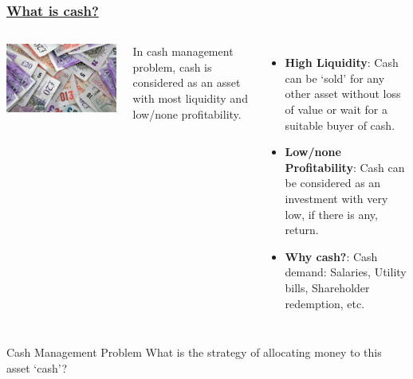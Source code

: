 \documentclass{beamer}
\begin{document}
\begin{frame}
\frametitle{\hyperlink{intro}{What is cash?}}
\begin{columns}
\begin{sideways}
\centering
\includegraphics[scale = 0.25]{cash}
\end{sideways}
In cash management problem, cash is considered as an asset with most liquidity and low/none profitability.

\begin{itemize}
\item<2-> \textbf{High Liquidity}: Cash can be `sold' for any other asset without loss of value or wait for a suitable buyer of cash.
\item<3-> \textbf{Low/none Profitability}: Cash can be considered as an investment with very low, if there is any, return.
\item<4>\textbf{Why cash?}: Cash demand: Salaries, Utility bills, Shareholder redemption, etc.
\end{itemize}

\end{columns}
\end{frame}


\begin{frame}

\begin{block}{Cash Management Problem}
What is the strategy of allocating money to this asset `cash'?
\end{block}

\end{frame}
\end{document}
